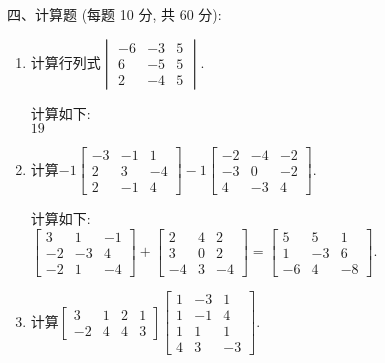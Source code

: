 \documentclass[12pt,a4paper]{ctexart}%
\begin{document}
%
\noindent 四、计算题 (每题 10 分, 共 60 分):%
\begin{enumerate}[1)]%
\item%
计算行列式$\begin{vmatrix}%
-6&-3&5\\%
6&-5&5\\%
2&-4&5%
\end{vmatrix}$.

\begin{solve}%
计算如下:\\
$19$%
\end{solve}%
\item%
计算$-1\begin{bmatrix}
-3 & -1 & 1\\
2 & 3 & -4\\
2 & -1 & 4
\end{bmatrix} -1\begin{bmatrix}
-2 & -4 & -2\\
-3 & 0 & -2\\
4 & -3 & 4
\end{bmatrix}$.

\begin{solve}%
计算如下:\\
$\begin{bmatrix}
3 & 1 & -1\\
-2 & -3 & 4\\
-2 & 1 & -4
\end{bmatrix}+\begin{bmatrix}
2 & 4 & 2\\
3 & 0 & 2\\
-4 & 3 & -4
\end{bmatrix}=\begin{bmatrix}
5 & 5 & 1\\
1 & -3 & 6\\
-6 & 4 & -8
\end{bmatrix}.$%
\end{solve}%
\item%
计算$\begin{bmatrix}
3 & 1 & 2 & 1\\
-2 & 4 & 4 & 3
\end{bmatrix}\begin{bmatrix}
1 & -3 & 1\\
1 & -1 & 4\\
1 & 1 & 1\\
4 & 3 & -3
\end{bmatrix}$.


\end{enumerate}
\end{document}
